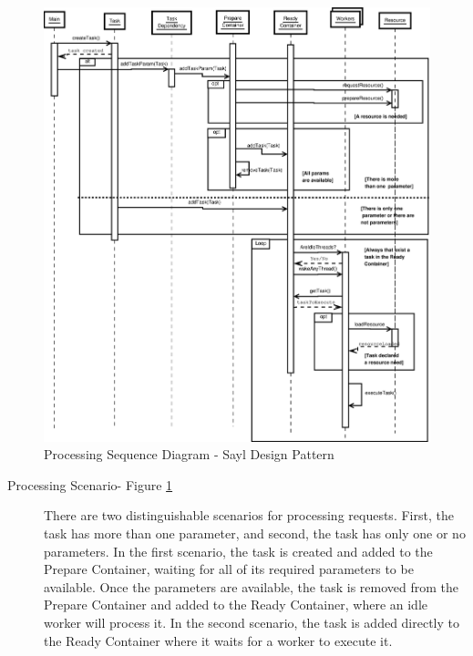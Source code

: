 \begin{figure}
	\centering
	\includegraphics*[width=1\textwidth, keepaspectratio=false]{fig/image26.eps}
	\caption{Processing Sequence Diagram - Sayl Design Pattern}
	\label{fig:seq_diagram_sayl}
\end{figure}


\begin{description}
	
	\item[Processing Scenario- Figure \ref{fig:seq_diagram_sayl}]
	There are two distinguishable scenarios for processing requests. First, the task has more than one parameter, and second, the task has only one or no parameters. In the first scenario, the task is created and added to the Prepare Container, waiting for all of its required parameters to be available. Once the parameters are available, the task is removed from the Prepare Container and added to the Ready Container, where an idle worker will process it. In the second scenario, the task is added directly to the Ready Container where it waits for a worker to execute it.  
	
\end{description}

